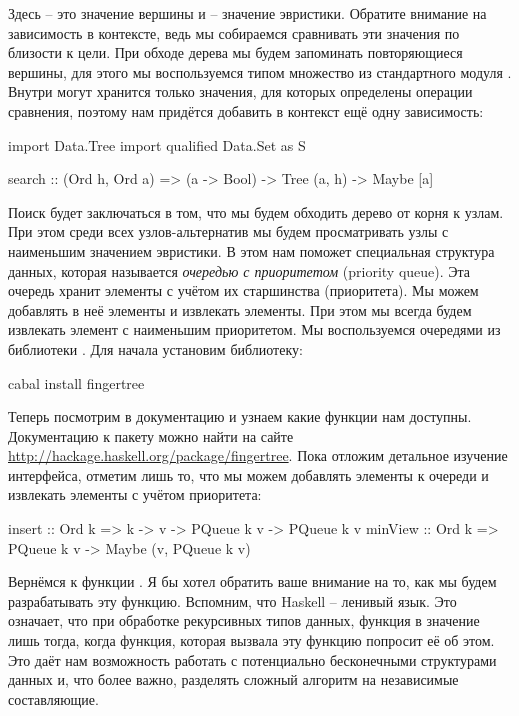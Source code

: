 Здесь  -- это значение вершины и  -- значение
эвристики. Обратите внимание на зависимость  в 
контексте, ведь мы собираемся сравнивать эти значения
по близости к цели. При обходе дерева мы будем запоминать
повторяющиеся вершины, для этого мы воспользуемся 
типом множество из стандартного модуля . 
Внутри  могут хранится только значения,
для которых определены операции сравнения, поэтому нам
придётся добавить в контекст ещё одну зависимость:

\begin{code}
import Data.Tree
import qualified Data.Set as S

search :: (Ord h, Ord a) => (a -> Bool) -> Tree (a, h) -> Maybe [a]
\end{code}

Поиск будет заключаться в том, что мы будем обходить
дерево от корня к узлам. При этом среди всех узлов-альтернатив
мы будем просматривать узлы с наименьшим значением эвристики.
В этом нам поможет специальная структура данных, которая называется 
\emph{очередью с приоритетом} (priority queue). 
Эта очередь хранит элементы с учётом их старшинства (приоритета).
Мы можем добавлять в неё элементы и извлекать элементы. 
При этом мы всегда будем извлекать элемент с наименьшим приоритетом.
Мы воспользуемся очередями из библиотеки . 
Для начала установим библиотеку:

\begin{code}
cabal install fingertree
\end{code}

Теперь посмотрим в документацию и узнаем какие функции нам доступны.
Документацию к пакету можно найти на сайте 
\url{http://hackage.haskell.org/package/fingertree}.
Пока отложим детальное изучение интерфейса, отметим
лишь то, что мы можем добавлять элементы к очереди
и извлекать элементы с учётом приоритета:

\begin{code}
insert  :: Ord k => k -> v -> PQueue k v -> PQueue k v
minView :: Ord k => PQueue k v -> Maybe (v, PQueue k v)
\end{code}

Вернёмся к функции . Я бы хотел обратить ваше внимание
на то, как мы будем разрабатывать эту функцию. 
Вспомним, что Haskell -- ленивый язык. Это означает, что
при обработке рекурсивных типов данных, функция 
в значение лишь тогда, когда функция, которая вызвала
эту функцию попросит её об этом. Это даёт нам возможность
работать с потенциально бесконечными структурами данных
и, что более важно, разделять сложный алгоритм на независимые
составляющие. 

